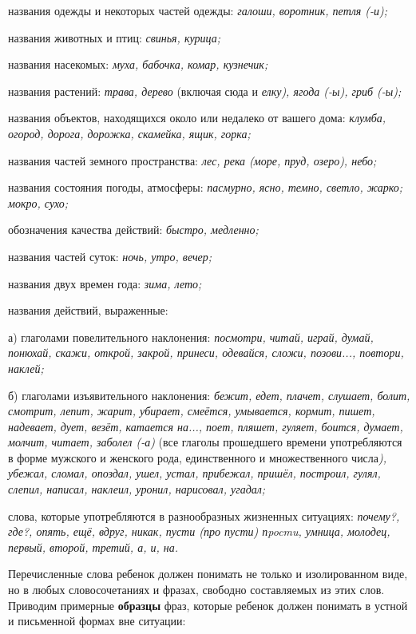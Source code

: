 \documentclass[a5paper]{book}
\renewcommand{\emph}[1]{\textit{#1}}
\begin{document}
названия одежды и некоторых частей одежды: \emph{галоши, воротник, петля
(-и);}

названия животных и птиц: \emph{свинья, курица;}

названия насекомых: \emph{муха, бабочка, комар, кузнечик;}

названия растений: \emph{трава, дерево} (включая сюда и \emph{елку),
ягода (-ы), гриб (-ы);}

названия объектов, находящихся около или недалеко от вашего дома:
\emph{клумба, огород, дорога, дорожка, скамейка, ящик, горка;}

названия частей земного пространства: \emph{лес, река (море, пруд,
озеро), небо;}

названия состояния погоды, атмосферы: \emph{пасмурно, ясно, темно,
светло, жарко; мокро, сухо;}

обозначения качества действий: \emph{быстро, медленно;}

названия частей суток: \emph{ночь, утро, вечер;}

названия двух времен года: \emph{зима, лето;}

названия действий, выраженные:

а) глаголами повелительного наклонения: \emph{посмотри, читай, играй,
думай, понюхай, скажи, открой, закрой, принеси, одевайся, сложи,
позови..., повтори, наклей;}

б) глаголами изъявительного наклонения: \emph{бежит, едет, плачет,
слушает, болит, смотрит, лепит, жарит, убирает, смеётся, умывается,
кормит, пишет, надевает, дует, везёт, катается на..., поет, пляшет,
гуляет, боится, думает, молчит, читает, заболел (-а)} (все глаголы
прошедшего времени употребляются в форме мужского и женского рода,
единственного и множественного числа\emph{), убежал, сломал, опоздал,
ушел, устал, прибежал, пришёл, построил, гулял, слепил, написал,
наклеил, уронил, нарисовал, угадал;}

слова, которые употребляются в разнообразных жизненных ситуациях:
\emph{почему?, где?, опять, ещё, вдруг, никак, пусти (про пусти) пpocmu,
умница, молодец, первый, второй, третий, а, и, на.}

Перечисленные слова ребенок должен понимать не только и изолированном
виде, но в любых словосочетаниях и фразах, свободно составляемых из этих
слов. Приводим примерные \textbf{образцы} фраз, которые ребенок должен
понимать в устной и письменной формах вне ситуации:
\end{document}
